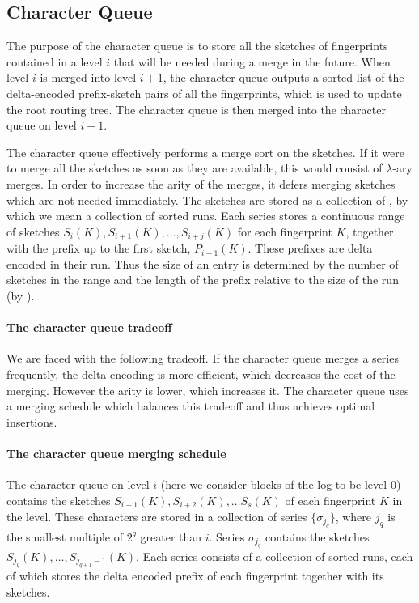 \subsection{Character Queue}\label{sec:character-queue}

The purpose of the character queue is to store all the sketches of fingerprints
contained in a level $i$ that will be needed during a merge in the future.
When level $i$ is merged into level $i+1$, the character queue outputs a sorted
list of the delta-encoded prefix-sketch pairs of all the fingerprints, which is
used to update the root routing tree. The character queue is then merged into
the character queue on level $i+1$.

The character queue effectively performs a merge sort on the sketches. If it
were to merge all the sketches as soon as they are available, this would
consist of $\lambda$-ary merges.  In order to increase the arity of the merges,
it defers merging sketches which are not needed immediately. The sketches are stored
as a collection of , by which we mean a collection of sorted runs. Each
series stores a continuous range of sketches
$S_i(K),S_{i+1}(K),\ldots,S_{i+j}(K)$ for each fingerprint $K$, together with
the prefix up to the first sketch, $P_{i-1}(K)$. These prefixes are delta
encoded in their run. Thus the size of an entry is determined by the number of
sketches in the range and the length of the prefix relative to the size of the
run (by ).

\paragraph{The character queue tradeoff}
We are faced with the following tradeoff. If the character queue merges a
series frequently, the delta encoding is more efficient, which decreases the
cost of the merging. However the arity is lower, which increases it. The
character queue uses a merging schedule which balances this tradeoff and thus
achieves optimal insertions.

\paragraph{The character queue merging schedule}
The character queue on level $i$ (here we consider blocks of the log to be
level $0$) contains the sketches $S_{i+1}(K), S_{i+2}(K),\ldots S_s(K)$ of each
fingerprint $K$ in the level. These characters are stored in a collection of
series $\{\sigma_{j_q}\}$, where $j_q$ is the smallest multiple of $2^q$
greater than $i$. Series $\sigma_{j_q}$ contains the sketches
$S_{j_q}(K),\ldots,S_{j_{q+1}-1}(K)$. Each series consists of a collection of
sorted runs, each of which stores the delta encoded prefix of each fingerprint
together with its sketches.

